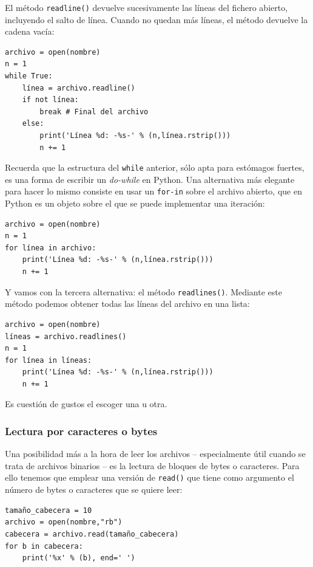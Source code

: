 El método \texttt{readline()} devuelve sucesivamente las líneas del fichero abierto, incluyendo el salto de línea. Cuando no quedan más líneas, el método devuelve la cadena vacía:

\begin{lstlisting}
archivo = open(nombre)
n = 1
while True:
    línea = archivo.readline()
    if not línea:
        break # Final del archivo
    else:
        print('Línea %d: -%s-' % (n,línea.rstrip()))
        n += 1
\end{lstlisting}

Recuerda que la estructura del \texttt{while} anterior, sólo apta para estómagos fuertes, es una forma de escribir un \emph{do-while} en Python. Una alternativa más elegante para hacer lo mismo consiste en usar un \texttt{for-in} sobre el archivo abierto, que en Python es un objeto sobre el que se puede implementar una iteración:

\begin{lstlisting}
archivo = open(nombre)
n = 1
for línea in archivo:
    print('Línea %d: -%s-' % (n,línea.rstrip()))
    n += 1
\end{lstlisting}

Y vamos con la tercera alternativa: el método \texttt{readlines()}. Mediante este método podemos obtener todas las líneas del archivo en una lista:

\begin{lstlisting}
archivo = open(nombre)
líneas = archivo.readlines()
n = 1
for línea in líneas:
    print('Línea %d: -%s-' % (n,línea.rstrip()))
    n += 1
\end{lstlisting}

Es cuestión de gustos el escoger una u otra.

\subsubsection{Lectura por caracteres o bytes}

Una posibilidad más a la hora de leer los archivos -- especialmente útil cuando se trata de archivos binarios -- es la lectura de bloques de bytes o caracteres. Para ello tenemos que emplear una versión de \texttt{read()} que tiene como argumento el número de bytes o caracteres que se quiere leer:

\begin{lstlisting}
tamaño_cabecera = 10
archivo = open(nombre,"rb")
cabecera = archivo.read(tamaño_cabecera)
for b in cabecera:
	print('%x' % (b), end=' ')
\end{lstlisting}


